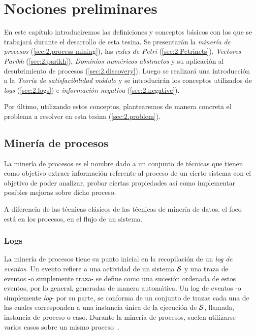 \chapter[Nociones preliminares]{Nociones preliminares}
\label{chap:2}

En este capítulo introduciremos las definiciones y conceptos básicos con los que se trabajará durante el desarrollo de 
esta tesina. Se presentarán la \textit{minería de procesos} (\autoref{sec:2.process mining}), 
las \textit{redes de Petri} (\autoref{sec:2.Petrinets}), \textit{Vectores Parikh} (\autoref{sec:2.parikh}), 
\textit{Dominios numéricos abstractos} y su aplicación al desubrimiento de procesos (\autoref{sec:2.discovery}).
Luego se realizará una introducción a la \textit{Teoría de satisfacibilidad módulo} 
y se introducirán los conceptos utilizados de \textit{logs} (\autoref{sec:2.logs}) 
e \textit{información negativa} (\autoref{sec:2.negative}).

Por último, utilizando estos conceptos, plantearemos de manera concreta el problema a resolver en 
esta tesina (\autoref{sec:2.problem}).

\section{Minería de procesos} 
\label{sec:2.process mining}

La minería de procesos es el nombre dado a un conjunto de técnicas que tienen
como objetivo extraer información referente al proceso de un cierto sistema
con el objetivo de poder analizar, probar ciertas propiedades 
así como implementar posibles mejoras sobre dicho proceso.

A diferencia de las técnicas clásicos de las técnicas de minería de datos, el foco
está en los procesos, en el flujo de un sistema.

\subsection{Logs} 
\label{sec:2.logs}

La minería de procesos tiene su punto inicial en la recopilación de un \textit{log de eventos}. 
Un evento refiere a una actividad de un sistema $\mathcal{S}$ y
una traza de eventos -o simplemente traza- se define como una sucesión
ordenada de estos eventos, por lo general, generadas de manera automática.
Un log de eventos -o simplemente \textit{log}- por su parte, se conforma de un
conjunto de trazas cada una de las cuales corresponden a una instancia única 
de la ejecución de $\mathcal{S}$, llamada, instancia de proceso o caso.
Durante la minería de procesos, suelen utilizarse varios casos sobre un mismo proceso~\cite{Aalst2004}.

